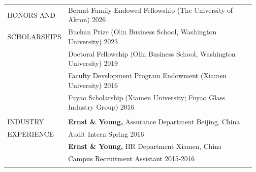 \documentclass[letterpaper, 11pt]{article}
\begin{document}
\begin{longtable}{p{1.15in}p{5.05in}}

\textcolor{internationalkleinblue}{HONORS AND} & Bernat Family Endowed Fellowship (The University of Akron) \hfill 2026 \\
\textcolor{internationalkleinblue}{SCHOLARSHIPS} & Buchan Prize (Olin Business School, Washington University) \hfill 2023 \\
& Doctoral Fellowship (Olin Business School, Washington University) \hfill 2019 \\
& Faculty Development Program Endowment (Xiamen University) \hfill 2016 \\
& Fuyao Scholarship (Xiamen University; Fuyao Glass Industry Group) \hfill 2016 \\
& \\






\textcolor{internationalkleinblue}{INDUSTRY} & {\textbf{Ernst \& Young,}} Assurance Department \hfill Beijing, China\\
\textcolor{internationalkleinblue}{EXPERIENCE} & Audit Intern \hfill Spring 2016 \\
 
& {\textbf{Ernst \& Young,}} HR Department \hfill Xiamen, China\\
& Campus Recruitment Assistant \hfill 2015-2016 \\
& \\




\end{longtable}
\end{document}
